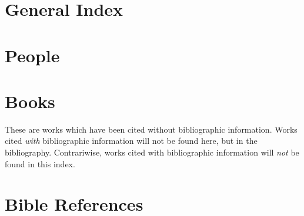 \documentclass[00-main.tex]{subfiles}
\begin{document}
\chapter{General Index}
\vspace{-3em}\renewcommand\indexname{}
\printindex

\chapter{People}\label{ind:people}

\vspace{-3em}\renewcommand\indexname{}
\printindex[people]

\chapter{Books}

These are works which have been cited without bibliographic information. Works cited \emph{with\/} bibliographic information will not be found here, but in the bibliography. Contrariwise, works cited with bibliographic information will \emph{not} be found in this index.

\vspace{-3em}\renewcommand\indexname{}
\printindex[books]

\chapter{Bible References}

\printindex[gen]

\printindex[exo]

\printindex[lev]

\printindex[num]

\printindex[deu]

\printindex[jos]

\printindex[jdg]

\printindex[rut]

\printindex[1sa]

\printindex[2sa]

\printindex[1ki]

\printindex[2ki]

\printindex[1ch]

\printindex[2ch]

\printindex[ezr]

\printindex[neh]

\printindex[est]

\printindex[job]
\end{document}
